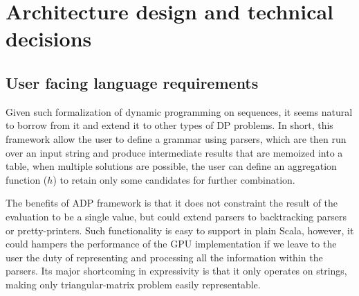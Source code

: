 \newpage
\section{Architecture design and technical decisions}
\subsection{User facing language requirements}

Given such formalization \cite{adp} of dynamic programming on sequences, it seems natural to borrow from it and extend it to other types of DP problems. In short, this framework allow the user to define a grammar using parsers, which are then run over an input string and produce intermediate results that are memoized into a table, when multiple solutions are possible, the user can define an aggregation function ($h$) to retain only some candidates for further combination.

The benefits of ADP framework is that it does not constraint the result of the evaluation to be a single value, but could extend parsers to backtracking parsers or pretty-printers. Such functionality is easy to support in plain Scala, however, it could hampers the performance of the GPU implementation if we leave to the user the duty of representing and processing all the information within the parsers. Its major shortcoming in expressivity is that it only operates on strings, making only triangular-matrix problem easily representable.

